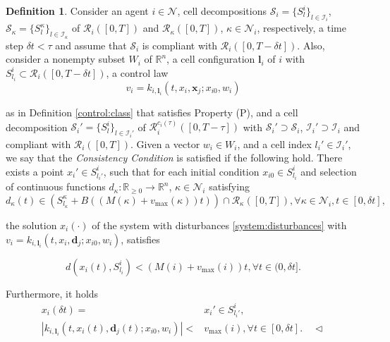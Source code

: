 \documentclass[reqno]{amsart}
\theoremstyle{plain}
\theoremstyle{definition}
\newtheorem{dfn}[thm]{Definition}
\numberwithin{equation}{section}
\begin{document}
\begin{dfn} \label{conditionCC}
Consider an agent $i\in{\ensuremath{\mathcal{N}}}$, cell decompositions ${\ensuremath{\mathcal{S}}}_i=\{S_l^i\}_{l\in{\ensuremath{\mathcal{I}}}_i}$, ${\ensuremath{\mathcal{S}}}_{\kappa}=\{S_l^{\kappa}\}_{l\in{\ensuremath{\mathcal{I}}}_{\kappa}}$ of ${\ensuremath{\mathcal{R}}}_i([0,T])$ and ${\ensuremath{\mathcal{R}}}_{\kappa}([0,T])$, $\kappa\in{\ensuremath{\mathcal{N}}}_i$, respectively, a time step $\delta t<\tau$ and assume that ${\ensuremath{\mathcal{S}}}_i$ is compliant with ${\ensuremath{\mathcal{R}}}_i([0,T-\delta t])$. Also, consider a nonempty subset $W_i$ of ${\ensuremath{\mathbb{R}^{{n}}}}$, a cell configuration ${\textbf{{l}}}_i$ of $i$ with $S_{l_i}^i\subset {\ensuremath{\mathcal{R}}}_i([0,T-\delta t])$, a control law
\begin{equation} \label{feedback:for:i}
v_i=k_{i,{\textbf{{l}}}_i}(t,x_{i},{\textbf{{x}}}_j;x_{i0},w_i)
\end{equation}

\noindent as in Definition \ref{control:class} that satisfies Property (P), and a cell decomposition ${\ensuremath{\mathcal{S}}}_i'=\{S_l^i\}_{l\in{\ensuremath{\mathcal{I}}}_i'}$  of ${\ensuremath{\mathcal{R}}}_i^{c_i(\tau)}([0,T-\tau])$ with ${\ensuremath{\mathcal{S}}}_i'\supset{\ensuremath{\mathcal{S}}}_i$, ${\ensuremath{\mathcal{I}}}_i'\supset{\ensuremath{\mathcal{I}}}_i$ and compliant with ${\ensuremath{\mathcal{R}}}_i([0,T])$. Given a vector $w_i\in W_i$, and a cell index $l_i'\in{\ensuremath{\mathcal{I}}}_i'$, we say that the \textit{Consistency Condition} is satisfied if the following hold. There exists a point $x_i'\in S_{l_i'}^i$, such that for each initial condition $x_{i0}\in S_{l_i}^i$ and selection of continuous functions $d_{\kappa}:{\ensuremath{\mathbb{R}_{ \geq 0}}}\to{\ensuremath{\mathbb{R}^{{n}}}}$, $\kappa\in{\ensuremath{\mathcal{N}}}_i$ satisfying
\begin{equation} \label{disturbance:bounds}
d_{\kappa}(t)\in (S_{l_{\kappa}}^{\kappa}+B((M(\kappa)+v_{\max}(\kappa))t))\cap{\ensuremath{\mathcal{R}}}_{\kappa}([0,T]),\forall\kappa\in{\ensuremath{\mathcal{N}}}_i,t\in [0,\delta t],
\end{equation}

\noindent the solution $x_i(\cdot)$ of the system with disturbances \eqref{system:disturbances} with $v_i=k_{i,{\textbf{{l}}}_i}(t,x_{i},{\textbf{{d}}}_j;x_{i0},w_i)$, satisfies

\begin{equation} \label{xi:consistency:bounds}
d(x_i(t),S_{l_i}^i)<(M(i)+v_{\max}(i))t, \forall t\in (0,\delta t].
\end{equation}

\noindent Furthermore, it holds
\begin{align} 
x_i(\delta t)= & x_i'\in S_{l_i'}^i, \label{xi:in:finalcell} \\
|k_{i,{\textbf{{l}}}_i}(t,x_{i}(t),{\textbf{{d}}}_j(t);x_{i0},w_i)|< & v_{\max}(i),\forall  t\in[0,\delta t].  \label{controler:consistency} \quad\triangleleft
\end{align}
\end{dfn}
\end{document}
